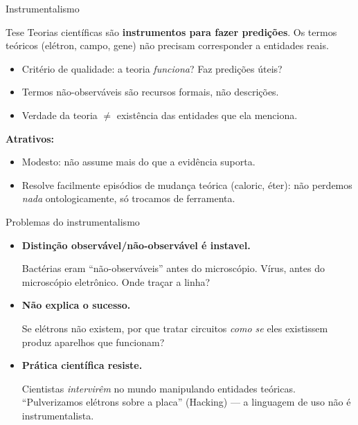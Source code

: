 \documentclass[aspectratio=169]{beamer}
\newcommand{\impt}[1]{\textcolor{maccent}{\textbf{#1}}}
\newcommand{\ntc}[1]{\textcolor{mprimary}{#1}}
\begin{document}
\begin{frame}{Instrumentalismo}
\begin{block}{Tese}
Teorias cient\'ificas s\~ao \impt{instrumentos para fazer predi\c c\~oes}. Os termos te\'oricos (el\'etron, campo, gene) n\~ao precisam corresponder a entidades reais.
\end{block}
\vspace{0.3cm}
\begin{itemize}
    \item Crit\'erio de qualidade: a teoria \emph{funciona}? Faz predi\c c\~oes \'uteis?
    \item Termos n\~ao-observ\'aveis s\~ao \ntc{recursos formais}, n\~ao descri\c c\~oes.
    \item Verdade da teoria $\neq$ exist\^encia das entidades que ela menciona.
\end{itemize}
\vspace{0.4cm}
\impt{Atrativos:}
\begin{itemize}
    \item Modesto: n\~ao assume mais do que a evid\^encia suporta.
    \item Resolve facilmente epis\'odios de mudan\c ca te\'orica (caloric, \'eter): n\~ao perdemos \emph{nada} ontologicamente, s\'o trocamos de ferramenta.
\end{itemize}
\end{frame}

\begin{frame}{Problemas do instrumentalismo}
\begin{itemize}
    \item \impt{Distin\c c\~ao observ\'avel/n\~ao-observ\'avel \'e instavel.}

    \vspace{0.1cm}
    Bact\'erias eram ``n\~ao-observ\'aveis'' antes do microsc\'opio. V\'irus, antes do microsc\'opio eletr\^onico. Onde tra\c car a linha?

    \vspace{0.3cm}
    \item \impt{N\~ao explica o sucesso.}

    \vspace{0.1cm}
    Se el\'etrons n\~ao existem, por que tratar circuitos \emph{como se} eles existissem produz aparelhos que funcionam?

    \vspace{0.3cm}
    \item \impt{Pr\'atica cient\'ifica resiste.}

    \vspace{0.1cm}
    Cientistas \emph{intervir\^em} no mundo manipulando entidades te\'oricas. ``Pulverizamos el\'etrons sobre a placa'' (Hacking) --- a linguagem de uso n\~ao \'e instrumentalista.
\end{itemize}
\end{frame}
\end{document}

